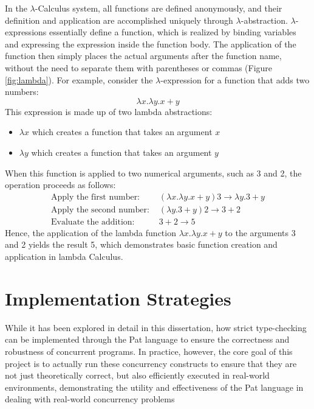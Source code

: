 \documentclass{l4proj}
\begin{document}
In the $\lambda$-Calculus system, all functions are defined anonymously, and their definition and application are accomplished uniquely through $\lambda$-abstraction. $\lambda$-expressions essentially define a function, which is realized by binding variables and expressing the expression inside the function body. The application of the function then simply places the actual arguments after the function name, without the need to separate them with parentheses or commas (Figure \ref{fig:lambda}). For example, consider the $\lambda$-expression for a function that adds two numbers:
\[
\lambda x.\lambda y.x+y
\]
This expression is made up of two lambda abstractions:
\begin{itemize}
    \item $\lambda x$ which creates a function that takes an argument $x$
    \item $\lambda y$ which creates a function that takes an argument $y$
\end{itemize}
When this function is applied to two numerical arguments, such as 3 and 2, the operation proceeds as follows:
\begin{align*}
\text{Apply the first number: } & (\lambda x.\lambda y.x+y)3 \rightarrow \lambda y.3+y \\
\text{Apply the second number: } & (\lambda y.3+y)2 \rightarrow 3+2 \\
\text{Evaluate the addition: } & 3+2 \rightarrow 5
\end{align*}
Hence, the application of the lambda function \(\lambda x.\lambda y.x+y\) to the arguments 3 and 2 yields the result 5, which demonstrates basic function creation and application in lambda Calculus.

\section{Implementation Strategies}

While it has been explored in detail in this dissertation, how strict type-checking can be implemented through the Pat language to ensure the correctness and robustness of concurrent programs. In practice, however, the core goal of this project is to actually run these concurrency constructs to ensure that they are not just theoretically correct, but also efficiently executed in real-world environments, demonstrating the utility and effectiveness of the Pat language in dealing with real-world concurrency problems
\end{document}

